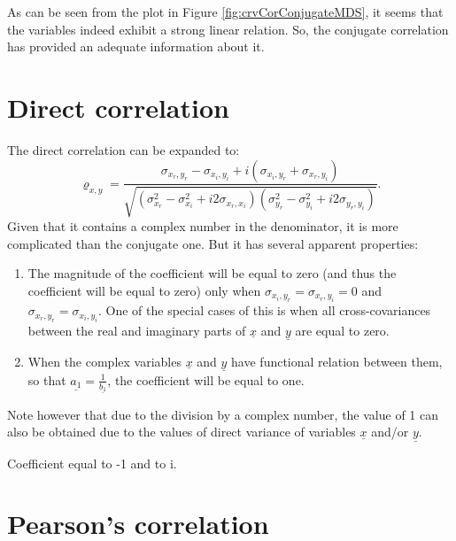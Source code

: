 \documentclass[
]{book}
\begin{document}
As can be seen from the plot in Figure \ref{fig:crvCorConjugateMDS}, it seems that the variables indeed exhibit a strong linear relation. So, the conjugate correlation has provided an adequate information about it.

\hypertarget{direct-correlation}{%
\section{Direct correlation}\label{direct-correlation}}

The direct correlation can be expanded to:
\begin{equation}
    {\varrho}_{x,y} = \frac{\sigma_{x_r, y_r} - \sigma_{x_i, y_i} + i (\sigma_{x_i, y_r} + \sigma_{x_r, y_i})}{\sqrt{(\sigma_{x_r}^2 - \sigma_{x_i}^2 + i2 \sigma_{x_r,x_i})(\sigma_{y_r}^2 - \sigma_{y_i}^2 + i2 \sigma_{y_r,y_i})}}.
    \label{eq:correlationPseudoExpanded}
\end{equation}
Given that it contains a complex number in the denominator, it is more complicated than the conjugate one. But it has several apparent properties:

\begin{enumerate}
\def\labelenumi{\arabic{enumi}.}
\item
  The magnitude of the coefficient will be equal to zero (and thus the coefficient will be equal to zero) only when \(\sigma_{x_i,y_r}=\sigma_{x_r,y_i}=0\) and \(\sigma_{x_r,y_r}=\sigma_{x_i,y_i}\). One of the special cases of this is when all cross-covariances between the real and imaginary parts of \(\underline{x}\) and \(\underline{y}\) are equal to zero.
\item
  When the complex variables \(\underline{x}\) and \(\underline{y}\) have functional relation between them, so that \(\underline{a_1} = \frac{1}{\underline{b_1}}\), the coefficient will be equal to one.
\end{enumerate}

Note however that due to the division by a complex number, the value of 1 can also be obtained due to the values of direct variance of variables \(\underline{x}\) and/or \(\underline{y}\).

Coefficient equal to -1 and to i.

\hypertarget{pearsons-correlation}{%
\section{Pearson's correlation}\label{pearsons-correlation}}
\end{document}
